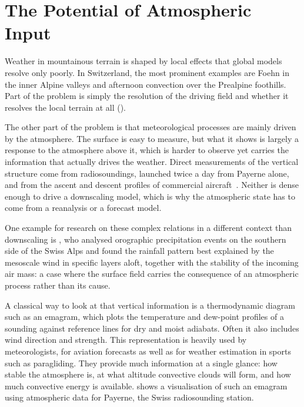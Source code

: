 \section{The Potential of Atmospheric Input}\label{sec:bg-atmos-vs-surface}



Weather in mountainous terrain is shaped by local effects that global models resolve only poorly. In Switzerland, the most prominent examples are Foehn in the inner Alpine valleys and afternoon convection over the Prealpine foothills. Part of the problem is simply the resolution of the driving field and whether it resolves the local terrain at all ().



The other part of the problem is that meteorological processes are mainly driven by the atmosphere. The surface is easy to measure, but what it shows is largely a response to the atmosphere above it, which is harder to observe yet carries the information that actually drives the weather. Direct measurements of the vertical structure come from radiosoundings, launched twice a day from Payerne alone, and from the ascent and descent profiles of commercial aircraft~\cite{meteoswiss_aircraft}. Neither is dense enough to drive a downscaling model, which is why the atmospheric state has to come from a reanalysis or a forecast model.



One example for research on these complex relations in a different context than downscaling is \textcite{panziera2010}, who analysed orographic precipitation events on the southern side of the Swiss Alps and found the rainfall pattern best explained by the mesoscale wind in specific layers aloft, together with the stability of the incoming air mass: a case where the surface field carries the consequence of an atmospheric process rather than its cause.



A classical way to look at that vertical information is a thermodynamic diagram such as an emagram, which plots the temperature and dew-point profiles of a sounding against reference lines for dry and moist adiabats. Often it also includes wind direction and strength. This representation is heavily used by meteorologists, for aviation forecasts as well as for weather estimation in sports such as paragliding. They provide much information at a single glance: how stable the atmosphere is, at what altitude convective clouds will form, and how much convective energy is available.  shows a visualisation of such an emagram using atmospheric data for Payerne, the Swiss radiosounding station. 



